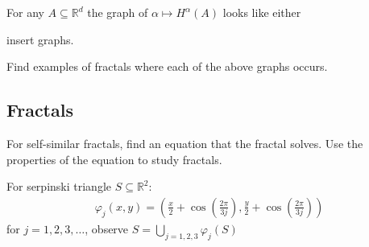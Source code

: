 For any $A \subseteq \mathbb{R}^d$ the graph of $\alpha \mapsto H^{\alpha} (A)$ looks like either 

insert graphs.

\begin{exercise}
	Find examples of fractals where each of the above graphs occurs.
\end{exercise}

\subsection{Fractals}

For self-similar fractals, find an equation that the fractal solves. Use the properties of the equation to study fractals.

\begin{example}
	For serpinski triangle $S \subseteq \mathbb{R}^2$:
	 \begin{align*}
	\varphi_{j} (x, y) = (\frac{x}{2} + \cos(\frac{2 \pi}{3 j}), \frac{y}{2} + \cos(\frac{2 \pi}{3 j}) )
	\end{align*} for $j = 1,2,3, \ldots$, observe
	$S = \bigcup_{j = 1,2,3} \varphi_j (S) $
\end{example}

